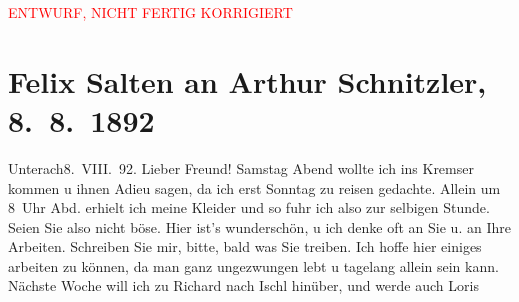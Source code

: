 
\begin{center}
            \textcolor{red}{ENTWURF, NICHT FERTIG KORRIGIERT}
                      \end{center}
            
         
         \renewcommand{\erwaehntePersonen}{Personen: Hermann Bahr, Richard Beer-Hofmann, Marie Glümer, Hugo von Hofmannsthal, Paul Horn, Felix Salten, Gustav Schwarzkopf}
         \renewcommand{\erwaehnteOrte}{Orte: Bad Ischl, Berghof, Café Kremser, Deutschland, Unterach am Attersee, Wien}
         \renewcommand{\erwaehnteWerke}{}
               \section[Felix Salten an Arthur Schnitzler, 8. 8. 1892]{ Felix Salten an Arthur Schnitzler, 8. 8. 1892}\nopagebreak{}\rehead{ }\begin{ledgroupsized}[t]{13cm}\normalsize\beginnumbering \toendnotes[C]{\smallbreak\pagebreak[2]} 
\toendnotes[C]{\smallbreak}\pstart
           \raggedleft{}{\pb}Unterach8. VIII. 92.\pend
           \pstart
           Lieber Freund!{ }Samstag{ }Abend wollte ich ins Kremser kommen u
               ihnen Adieu sagen, da ich erst Sonntag zu reisen
               gedachte. Allein um 8 Uhr Abd. erhielt ich meine Kleider und so fuhr ich
               also zur selbigen Stunde. Seien Sie also nicht böse. Hier ist’s wunderschön, u ich
               denke oft an Sie u. an Ihre Arbeiten. Schreiben Sie mir, bitte, bald was Sie
               treiben.\pend
           \pstart
           {\pb}Ich hoffe hier einiges arbeiten zu können,
               da man ganz ungezwungen lebt u tagelang allein sein kann. Nächste Woche will ich zu
                  Richard nach Ischl hinüber, und werde auch Loris

\end{ledgroupsized}
